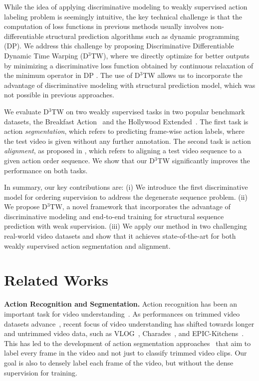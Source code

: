 \documentclass[10pt,twocolumn,letterpaper]{article}
\newcommand{\dttw}{D${}^3$TW\xspace}
\begin{document}
While the idea of applying discriminative modeling to weakly supervised action labeling problem is seemingly intuitive, the key technical challenge is that the computation of loss functions in previous methods usually involves non-differentiable structural prediction algorithms such as dynamic programming (DP). We address this challenge by proposing Discriminative Differentiable Dynamic Time Warping (\dttw), where we directly optimize for better outputs by minimizing a discriminative loss function obtained by continuous relaxation of the minimum operator in DP \cite{mensch2018differentiable}. The use of \dttw allows us to incorporate the advantage of discriminative modeling with structural prediction model, which was not possible in previous approaches. 

We evaluate \dttw on two weakly supervised tasks in two popular benchmark datasets, the Breakfast Action~\cite{kuehne2014language} and the Hollywood Extended~\cite{bojanowski2014weakly}. The first task is action \emph{segmentation}, which refers to predicting frame-wise action labels, where the test video is given without any further annotation. The second task is action \emph{alignment}, as proposed in \cite{bojanowski2014weakly}, which refers to aligning a test video sequence to a given action order sequence.
We show that our \dttw significantly improves the performance on both tasks. 


In summary, our key contributions are: 
(i) We introduce the first discriminative model for ordering supervision to address the degenerate sequence problem. 
(ii) We propose \dttw, a novel framework that incorporates the advantage of discriminative modeling and end-to-end training for structural sequence prediction with weak supervision. 
(iii) We apply our method in two challenging real-world video datasets and show that it achieves state-of-the-art for both weakly supervised action segmentation and alignment. \section{Related Works}
\label{sec:relatedworks}

\noindent\textbf{Action Recognition and Segmentation.} 
Action recognition has been an important task for video understanding~\cite{heilbron2015activitynet,pirsiavash2014parsing,sener2015unsupervised,vo2014stochastic}. As performances on trimmed video datasets advance~\cite{heilbron2015activitynet,carreira2017quo}, recent focus of video understanding has shifted towards longer and untrimmed video data, such as VLOG~\cite{fouhey2018lifestyle}, Charades~\cite{sigurdsson2016hollywood}, and EPIC-Kitchens~\cite{Damen2018EPICKITCHENS}. This has led to the development of action segmentation approaches~\cite{lea2016temporal,sigurdsson2017asynchronous,yeung2015every} that aim to label every frame in the video and not just to classify trimmed video clips. Our goal is also to densely label each frame of the video, but without the dense supervision for training. 
\end{document}
